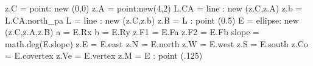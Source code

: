 \begin{tkzelements}
z.C   = point: new (0,0)
z.A   = point:new(4,2)
L.CA  = line : new (z.C,z.A)
z.b   = L.CA.north_pa
L     = line : new (z.C,z.b)
z.B   = L : point (0.5)
E     = ellipse: new (z.C,z.A,z.B) a = E.Rx
b     = E.Ry
z.F1  = E.Fa
z.F2  = E.Fb
slope = math.deg(E.slope)
z.E   = E.east
z.N   = E.north
z.W   = E.west
z.S   = E.south
z.Co  = E.covertex
z.Ve  = E.vertex
z.M   = E : point (.125)
\end{tkzelements}
 
\begin{center}
\end{center}

 
\endinput